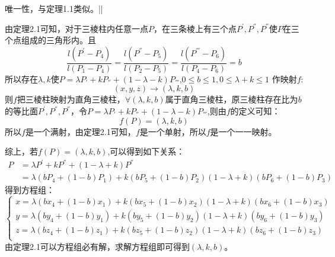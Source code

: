 \documentclass[12pt,a4paper]{article}
\begin{document}
唯一性，与定理1.1类似。||

由定理2.1可知，对于三棱柱内任意一点$P$，在三条棱上有三个点$P^{'},P^{''},P^{''}$使$P$在三个点组成的三角形内。且
$$
\frac{l(P^{'}-P_4)}{l(P_1-P_4)} =\frac{l(P^{''}-P_5)}{l(P_2-P_5)} =\frac{l(P^{'''}-P_6)}{l(P_4-P_6)}=b
$$
所以存在$\lambda,k$使$P=\lambda P_{'}+k P_{''}+(1-\lambda-k)P_{'''}$,$0\le b \le 1,0\le \lambda+k\le 1$
作映射$f$:
$$
(x,y,z)\to (\lambda,k,b)
$$
则$f$把三棱柱映射为直角三棱柱，$\forall (\lambda,k,b)$属于直角三棱柱，原三棱柱存在比为$b$的等比面$P^{'},P^{''},P^{''}$，令$P=\lambda P_{'}+k P_{''}+(1-\lambda-k)P_{'''}$,则由$f$的定义可知：
$$
f(P)=(\lambda,k,b)
$$
所以$f$是一个满射，由定理2.1可知，$f$是一个单射，所以$f$是一个一一映射。

综上，若$f(P)=(\lambda,k,b)$,可以得到如下关系：
\begin{align*}
P&=\lambda P^{'}+k P^{''}+(1-\lambda+k)P^{''}\\
&=\lambda (b P_4+(1-b)P_1)+k(b P_5+(1-b)P_2)(1-\lambda+k)(b P_6+(1-b)P_3)
\end{align*}
得到方程组：
$$
\begin{cases}
x=\lambda (b x_4+(1-b)x_1)+k(b x_5+(1-b)x_2)(1-\lambda+k)(b x_6+(1-b)x_3)\\
y=\lambda (b y_4+(1-b)y_1)+k(b y_5+(1-b)y_2)(1-\lambda+k)(b y_6+(1-b)y_3)\\
z=\lambda (b z_4+(1-b)z_1)+k(b z_5+(1-b)z_2)(1-\lambda+k)(b z_6+(1-b)z_3)\\
\end{cases}
$$
由定理2.1可以方程组必有解，求解方程组即可得到$(\lambda,k,b)$。
\end{document}
